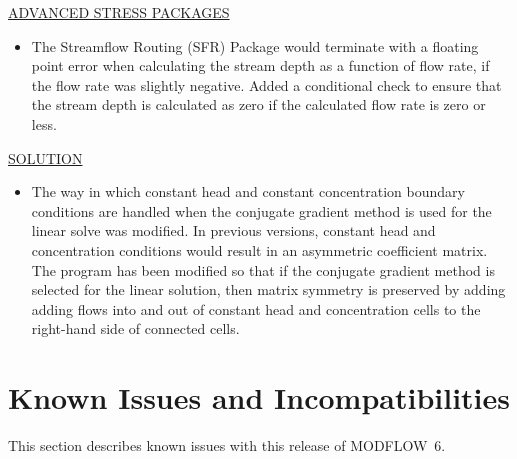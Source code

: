 \documentclass[11pt,twoside,twocolumn]{usgsreport}
\begin{document}
\begin{itemize}
	\underline{ADVANCED STRESS PACKAGES}
	\begin{itemize}
	        \item The Streamflow Routing (SFR) Package would terminate with a floating point error when calculating the stream depth as a function of flow rate, if the flow rate was slightly negative.  Added a conditional check to ensure that the stream depth is calculated as zero if the calculated flow rate is zero or less.
	\end{itemize}

	\underline{SOLUTION}
	\begin{itemize}
	        \item The way in which constant head and constant concentration boundary conditions are handled when the conjugate gradient method is used for the linear solve was modified.  In previous versions, constant head and concentration conditions would result in an asymmetric coefficient matrix.  The program has been modified so that if the conjugate gradient method is selected for the linear solution, then matrix symmetry is preserved by adding adding flows into and out of constant head and concentration cells to the right-hand side of connected cells.
	\end{itemize}

\end{itemize}


\section{Known Issues and Incompatibilities}
This section describes known issues with this release of MODFLOW~6.  
\end{document}
